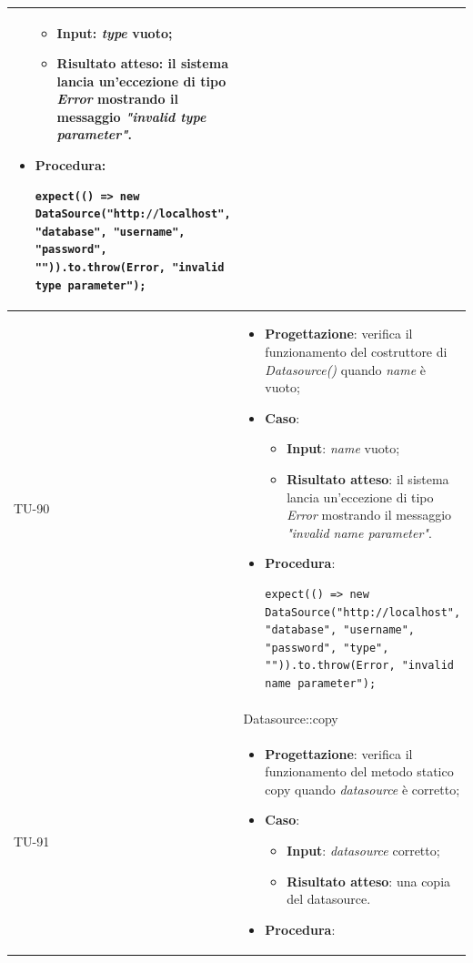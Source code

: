 \begin{longtable}{|C{1.5cm}|C{14.5cm}|}
\begin{itemize}
	\begin{itemize}
		\item \textbf{Input}: \emph{type} vuoto;
		\item \textbf{Risultato atteso}: il sistema lancia un'eccezione di tipo \emph{Error} mostrando il messaggio \emph{"invalid type parameter"}.
	\end{itemize}
	\item \textbf{Procedura}:
	\begin{lstlisting}
expect(() => new DataSource("http://localhost", "database", "username", "password", "")).to.throw(Error, "invalid type parameter");
	\end{lstlisting}
\end{itemize}\\
\hline
{TU-90} &
\begin{itemize}
	\item \textbf{Progettazione}: verifica il funzionamento del costruttore di \emph{Datasource()} quando \emph{name} è vuoto;
	\item \textbf{Caso}: 
	\begin{itemize}
		\item \textbf{Input}: \emph{name} vuoto;
		\item \textbf{Risultato atteso}: il sistema lancia un'eccezione di tipo \emph{Error} mostrando il messaggio \emph{"invalid name parameter"}.
	\end{itemize}
	\item \textbf{Procedura}:
	\begin{lstlisting}
expect(() => new DataSource("http://localhost", "database", "username", "password", "type", "")).to.throw(Error, "invalid name parameter");
	\end{lstlisting}
\end{itemize}\\
\hline
{} & Datasource::copy
\\ \hline
{TU-91} &
\begin{itemize}
	\item \textbf{Progettazione}: verifica il funzionamento del metodo statico copy quando \emph{datasource} è corretto;
	\item \textbf{Caso}: 
	\begin{itemize}
		\item \textbf{Input}: \emph{datasource} corretto;
		\item \textbf{Risultato atteso}: una copia del datasource.
	\end{itemize}
	\item \textbf{Procedura}:

\end{itemize}
\end{longtable}

